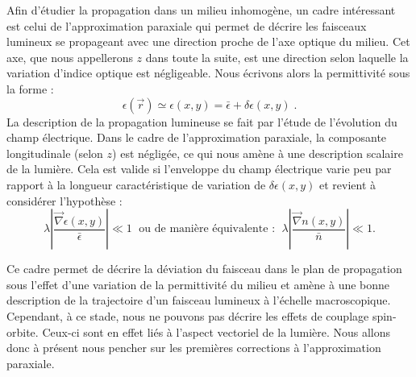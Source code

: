 \documentclass[a4paper,11pt]{article} %
\begin{document}
	Afin d'étudier la propagation dans un milieu inhomogène, un cadre intéressant est celui de l'approximation paraxiale qui permet de décrire les faisceaux lumineux se propageant avec une direction proche de l'axe optique du milieu. Cet axe, que nous appellerons $ z $ dans toute la suite, est une direction selon laquelle la variation d'indice optique est négligeable. Nous écrivons alors la permittivité sous la forme :
	\begin{equation*}
		\epsilon(\vec{r}) \simeq \epsilon(x,y) = \bar{\epsilon} + \delta \epsilon(x,y) \; .
	\end{equation*}
	La description de la propagation lumineuse se fait par l'étude de l'évolution du champ électrique. Dans le cadre de l'approximation paraxiale, la composante longitudinale (selon $ z $) est négligée, ce qui nous amène à une description scalaire de la lumière. Cela est valide si l'enveloppe du champ électrique varie peu par rapport à la longueur caractéristique de variation de $\delta \epsilon (x,y)$ et revient à considérer l'hypothèse : 
	\begin{equation}
		\label{hyp_var_epsilon}
		\lambda \left| \frac{\vec{\nabla}\epsilon(x,y)}{\bar{\epsilon}} \right| \ll 1 \; \text{ ou de manière équivalente : } \; \lambda \left| \frac{\vec{\nabla}n(x,y)}{\bar{n}} \right| \ll 1 .
	\end{equation}
	
	
	Ce cadre permet de décrire la déviation du faisceau dans le plan de propagation sous l'effet d'une variation de la permittivité du milieu et amène à une bonne description de la trajectoire d'un faisceau lumineux à l'échelle macroscopique. Cependant, à ce stade, nous ne pouvons pas décrire les effets de couplage spin-orbite. Ceux-ci sont en effet liés à l'aspect vectoriel de la lumière. Nous allons donc à présent nous pencher sur les premières corrections à l'approximation paraxiale.
	
\end{document}
